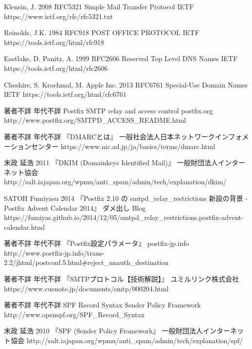\begin{thebibliography}{99}

\item
	Klensin, J.
	2008
	RFC5321 Simple Mail Transfer Protocol
	IETF
	https://www.ietf.org/rfc/rfc5321.txt

\item
	Reinolds, J.K.
	1984
	RFC918 POST OFFICE PROTOCOL
	IETF
	https://tools.ietf.org/html/rfc918

\item
	Eastlake, D. Panitz, A.
	1999
	RFC2606 Reserved Top Level DNS Names
	IETF
	https://tools.ietf.org/html/rfc2606 

\item
	Cheshire, S. Krochmal, M. Apple Inc.
	2013
	RFC6761 Special-Use Domain Names
	IETF
	https://tools.ietf.org/html/rfc6761
	
\item
	著者不詳
	年代不詳
	Postfix SMTP relay and access control
	postfix.org
	http://www.postfix.org/SMTPD\_ACCESS\_README.html

\item
	著者不詳
	年代不詳
	『DMARCとは』
	一般社会法人日本ネットワークインフォメーションセンター
	https://www.nic.ad.jp/ja/basics/terms/dmarc.html

	
\item
	末政 延浩
	2011
	『DKIM (Domainkeys Identified Mail)』
	一般財団法人インターネット協会
	http://salt.iajapan.org/wpmu/anti\_spam/admin/tech/explanation/dkim/

\item
	SATOH Fumiyasu
	2014
	『Postfix 2.10 の smtpd\_relay\_restrictions 新設の背景 - Postfix Advent Calendar 2014』
	ダメ出し Blog
	https://fumiyas.github.io/2014/12/05/smtpd\_relay\_restrictions.postfix-advent-calendar.html
	
\item
	著者不詳
	年代不詳
	『Postfix設定パラメータ』
	postfix-jp.info
	http://www.postfix-jp.info/trans-2.2/jhtml/postconf.5.html\#reject\_unauth\_destination

\item
	著者不詳
	年代不詳
	『SMTPプロトコル【技術解説】』
	ユミルリンク株式会社
	https://www.cuenote.jp/documents/smtp/000204.html

\item
	著者不詳
	年代不詳
	SPF Record Syntax
	Sender Policy Framework
	http://www.openspf.org/SPF\_Record\_Syntax

\item
	末政 延浩
	2010
	『SPF (Sender Policy Framework』	
	一般財団法人インターネット協会
	http://salt.iajapan.org/wpmu/anti\_spam/admin/tech/explanation/spf/


\end{thebibliography}